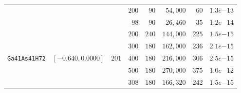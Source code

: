 \begin{tabular}{l|c|c|c|c|c|c|c}
 & & & $200$ & $\phantom{0}90$ & $\phantom{0}54,000$ & $\phantom{0}60$ & $1.3e{-13}$ \\
 & & & $\phantom{0}98$ & $\phantom{0}90$ & $\phantom{0}26,460$ & $\phantom{0}35$ & $1.2e{-14}$ \\\hline
 & & & $200$ & $240$ & $144,000$ & $225$ & $1.5e{-15}$ \\
 & & & $300$ & $180$ & $162,000$ & $236$ & $2.1e{-15}$ \\
\verb|Ga41As41H72| & $[-0.640,0.0000]$ & $201$ & $400$ & $180$ & $216,000$ & $306$ & $2.5e{-15}$ \\
 & & & $500$ & $180$ & $270,000$ & $375$ & $1.0e{-12}$ \\
 & & & $308$ & $180$ & $166,320$ & $242$ & $1.5e{-15}$ \\\hline
\end{tabular}